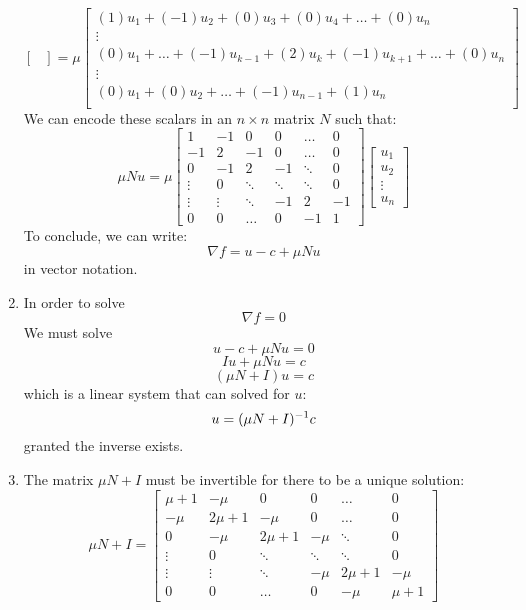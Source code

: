 \documentclass[12pt]{article}
\begin{document}
\begin{enumerate}[label=\alph*)]
\[\begin{bmatrix}
        \end{bmatrix} 
        = \mu \begin{bmatrix}
            (1)u_1 + (-1)u_{2} + (0)u_3 + (0)u_4
            + \dots + (0)u_n \\
            \vdots \\
            (0)u_1 + \dots + (-1)u_{k-1} + (2)u_k
            + (-1)u_{k+1} + \dots + (0)u_n \\
            \vdots \\
            (0)u_1 + (0)u_{2} + \dots + 
            (-1)u_{n-1} + (1)u_{n} \\
        \end{bmatrix}  \]
        We can encode these scalars in an
        $n \times n$ matrix $N$ such that:
        \[ \mu Nu = 
        \mu \begin{bmatrix}
            1 & -1 & 0 & 0 & \dots & 0 \\ 
            -1 & 2 & -1 & 0 & \dots & 0 \\
            0 & -1 & 2 & -1 & \ddots & 0 \\
            \vdots & 0 & \ddots & \ddots & \ddots & 0 \\
            \vdots & \vdots & \ddots & -1 & 2 & -1 \\
            0 & 0 & \dots & 0 & -1 & 1
        \end{bmatrix}
        \begin{bmatrix}
            u_1 \\ u_2 \\ \vdots \\ u_n
        \end{bmatrix} \]
        To conclude,
        we can write:
        \[ \nabla f = u - c + \mu Nu \]
        in vector notation.
        \item 
        In order to solve
        \[ \nabla f = 0 \]
        We must solve
        \[  u - c + \mu Nu = 0 \]
        \[  Iu + \mu Nu = c \]
        \[  (\mu N + I)u = c \]
        which is a linear system that can solved
        for $u$:
        \[ u =  (\mu N + I)^{-1} c \]
        granted the inverse exists.
        \item 
        The matrix $\mu N + I$ must be invertible
        for there to be a unique solution:
        \[ \mu N + I = 
        \begin{bmatrix}
            \mu+1 & -\mu & 0 & 0 & \dots & 0 \\ 
            -\mu & 2\mu + 1 & -\mu & 0 & \dots & 0 \\
            0 & -\mu & 2\mu + 1 & -\mu & \ddots & 0 \\
            \vdots & 0 & \ddots & \ddots & \ddots & 0 \\
            \vdots & \vdots & \ddots & -\mu 
            & 2\mu + 1 & -\mu \\
            0 & 0 & \dots & 0 & -\mu & \mu + 1
        \end{bmatrix}
        \]
    \end{enumerate}
    
\end{document}
